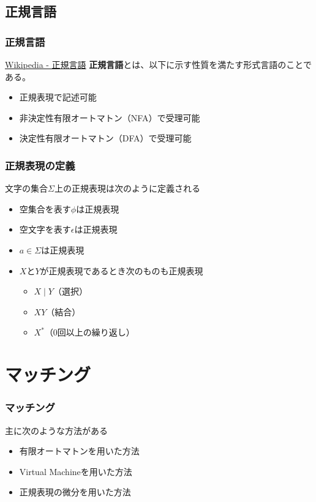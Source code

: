 \documentclass[12pt, unicode, svgnames, handout]{beamer}
\begin{document}
\subsection{正規言語}
\begin{frame}[fragile]
  \frametitle{正規言語}

  \begin{block}{}
    \begin{shadequote}[r]{\scriptsize\href{https://ja.wikipedia.org/wiki/\%E6\%AD\%A3\%E8\%A6\%8F\%E8\%A8\%80\%E8\%AA\%9E}{Wikipedia - 正規言語}}
      \textbf{正規言語}とは、以下に示す性質を満たす形式言語のことである。
      \begin{itemize}
        \item<2-> 正規表現で記述可能
        \item<3-> 非決定性有限オートマトン（NFA）で受理可能
        \item<4-> 決定性有限オートマトン（DFA）で受理可能
      \end{itemize}
    \end{shadequote}
  \end{block}
\end{frame}

\begin{frame}[fragile]
  \frametitle{正規表現の定義}

  文字の集合$\Sigma$上の正規表現は次のように定義される
  \begin{block}{}
    \begin{itemize}
      \item<2-> 空集合を表す$\phi$は正規表現
      \item<3-> 空文字を表す$\epsilon$は正規表現
      \item<4-> $a \in \Sigma$は正規表現
      \item<5-> $X$と$Y$が正規表現であるとき次のものも正規表現
        \begin{itemize}
          \item<6-> $X \mid Y$（選択）
          \item<7-> $X Y$（結合）
          \item<8-> $X^*$（0回以上の繰り返し）
        \end{itemize}
    \end{itemize}
  \end{block}
\end{frame}

\section{マッチング}
\begin{frame}[fragile]
  \frametitle{マッチング}

  主に次のような方法がある
  \begin{itemize}
    \item<2-> 有限オートマトンを用いた方法
    \item<3-> Virtual Machineを用いた方法
    \item<4-> 正規表現の微分を用いた方法
  \end{itemize}
\end{frame}
\end{document}
